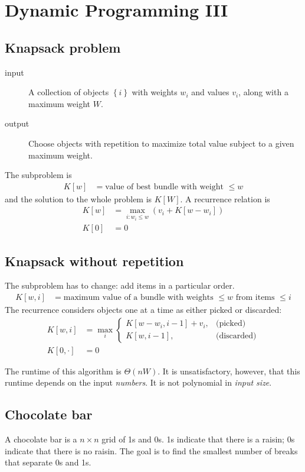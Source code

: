 \chapter{Dynamic Programming III}
\section{Knapsack problem} 
\begin{description}
	\item[input] A collection of objects \(\left\{i\right\}\) with weights \(w_i\) and values \(v_i\), along with a maximum weight \(W\).
	\item[output] Choose objects with repetition to maximize total value subject to a given maximum weight.
\end{description}

The subproblem is
\begin{align}
	K[w] &= \text{value of best bundle with weight \(\leq w\)}
\end{align}
and the solution to the whole problem is \(K[W]\).
A recurrence relation is
\begin{align}
	K[w] &= \max_{i: w_i \leq w} \left(v_i + K[w - w_i]\right) \\
	K[0] &= 0
\end{align}

\section{Knapsack without repetition}
The subproblem has to change: add items in a particular order.
\begin{align}
K[w, i] &= \text{maximum value of a bundle with weights \(\leq w\) from items \(\leq i\)}
\end{align}
The recurrence considers objects one at a time as either picked or discarded:
\begin{align}
K[w, i] &= \max_i\begin{cases}
	K[w - w_i, i - 1] + v_i, &\text{(picked)}\\
	K[w, i - 1], &\text{(discarded)}
\end{cases}\\
K[0, \cdot] &= 0
\end{align}

The runtime of this algorithm is \(\Theta(nW)\). It is unsatisfactory, however, that this runtime depends on the input \emph{numbers}. It is not polynomial in \emph{input size}.

\section{Chocolate bar}
A chocolate bar is a \(n\times n\) grid of 1s and 0s. 1s indicate that there is a raisin; 0s indicate that there is no raisin. The goal is to find the smallest number of breaks that separate 0s and 1s.

